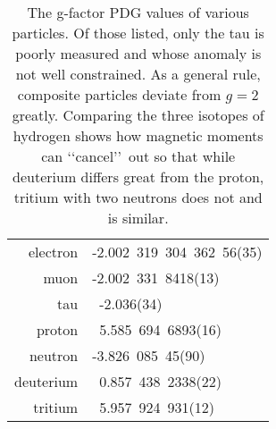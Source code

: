\begin{table}
	\centering
\begin{tabular}{|r|l|}
	electron & -2.002\ 319\ 304\ 362\ 56(35)\\
	muon & -2.002\ 331\ 8418(13)\\
	tau & \ -2.036(34)\\
	proton & \ 5.585\ 694\ 6893(16)\\
	neutron & -3.826\ 085\ 45(90)\\
	deuterium & \ 0.857\ 438\ 2338(22)\\
	tritium & \ 5.957\ 924\ 931(12)
\end{tabular}
	\caption{The g-factor PDG values of various particles. Of those listed, only the tau is poorly measured and whose anomaly is not well constrained. As a general rule, composite particles deviate from $g=2$ greatly. Comparing the three isotopes of hydrogen shows how magnetic moments can \lq\lq cancel\rq\rq\ out so that while deuterium differs great from the proton, tritium with two neutrons does not and is similar.}
	\label{ajs:table:01}
\end{table}

